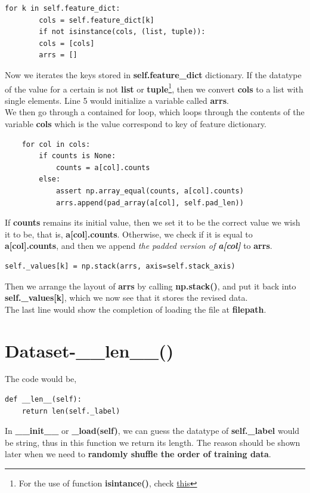\documentclass[12pt]{report}
\numberwithin{equation}{section}
\begin{document}
\begin{lstlisting}
for k in self.feature_dict:
        cols = self.feature_dict[k]
        if not isinstance(cols, (list, tuple)):
        cols = [cols]
        arrs = []
\end{lstlisting}

Now we iterates the keys stored in \textbf{self.feature\_dict} dictionary. If the datatype of the value for a certain is not \textbf{list} or \textbf{tuple}\footnote{For the use of function \textbf{isintance()}, check \hyperlink{https://reurl.cc/blozQM}{this}}, then we convert \textbf{cols} to a list with single elements. Line 5 would initialize a variable called \textbf{arrs}.
\\\indent We then go through a contained for loop, which loops through the contents of the variable \textbf{cols} which is the value correspond to key of feature dictionary.

\begin{lstlisting}
    for col in cols:
        if counts is None:
            counts = a[col].counts
        else:
            assert np.array_equal(counts, a[col].counts)
            arrs.append(pad_array(a[col], self.pad_len))
\end{lstlisting}

If \textbf{counts} remains its initial value, then we set it to be the correct value we wish it to be, that is, \textbf{a[col].counts}. 
Otherwise, we check if it is equal to \textbf{a[col].counts}, and then we append \textit{the padded version of \textbf{a[col]}} to \textbf{arrs}.

\begin{lstlisting}
self._values[k] = np.stack(arrs, axis=self.stack_axis)
\end{lstlisting}

Then we arrange the layout of \textbf{arrs} by calling \textbf{np.stack()}, and put it back into \textbf{self.\_values[k]}\label{sec:values}, which we now see that it stores the revised data.
\\\indent The last line would show the completion of loading the file at \textbf{filepath}. 
\section{Dataset-\_\_len\_\_()}
The code would be,
\begin{lstlisting}
def __len__(self):
    return len(self._label)
\end{lstlisting}

In \textbf{\_\_init\_\_} or \textbf{\_load(self)}, we can guess the datatype of \textbf{self.\_label} would be string, thus in this function we return its length. The reason should be shown later when we need to \textbf{randomly shuffle the order of training data}.
\end{document}
